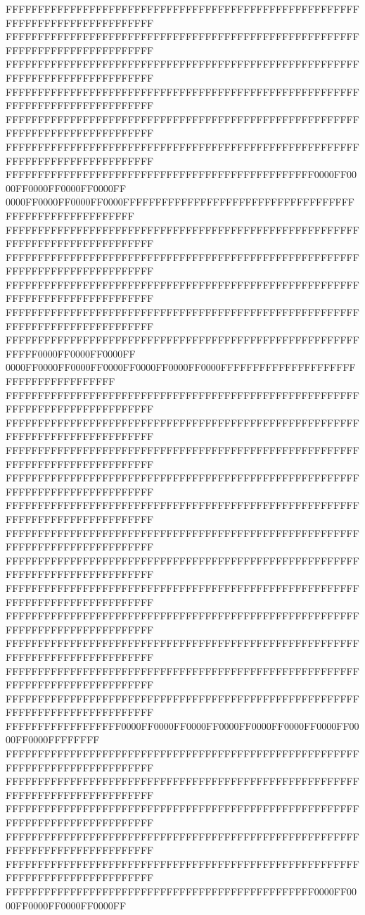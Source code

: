 FFFFFFFFFFFFFFFFFFFFFFFFFFFFFFFFFFFFFFFFFFFFFFFFFFFFFFFFFFFFFFFFFFFFFFFFFFFFFF
FFFFFFFFFFFFFFFFFFFFFFFFFFFFFFFFFFFFFFFFFFFFFFFFFFFFFFFFFFFFFFFFFFFFFFFFFFFFFF
FFFFFFFFFFFFFFFFFFFFFFFFFFFFFFFFFFFFFFFFFFFFFFFFFFFFFFFFFFFFFFFFFFFFFFFFFFFFFF
FFFFFFFFFFFFFFFFFFFFFFFFFFFFFFFFFFFFFFFFFFFFFFFFFFFFFFFFFFFFFFFFFFFFFFFFFFFFFF
FFFFFFFFFFFFFFFFFFFFFFFFFFFFFFFFFFFFFFFFFFFFFFFFFFFFFFFFFFFFFFFFFFFFFFFFFFFFFF
FFFFFFFFFFFFFFFFFFFFFFFFFFFFFFFFFFFFFFFFFFFFFFFFFFFFFFFFFFFFFFFFFFFFFFFFFFFFFF
FFFFFFFFFFFFFFFFFFFFFFFFFFFFFFFFFFFFFFFFFFFFFFFF0000FF0000FF0000FF0000FF0000FF
0000FF0000FF0000FF0000FFFFFFFFFFFFFFFFFFFFFFFFFFFFFFFFFFFFFFFFFFFFFFFFFFFFFFFF
FFFFFFFFFFFFFFFFFFFFFFFFFFFFFFFFFFFFFFFFFFFFFFFFFFFFFFFFFFFFFFFFFFFFFFFFFFFFFF
FFFFFFFFFFFFFFFFFFFFFFFFFFFFFFFFFFFFFFFFFFFFFFFFFFFFFFFFFFFFFFFFFFFFFFFFFFFFFF
FFFFFFFFFFFFFFFFFFFFFFFFFFFFFFFFFFFFFFFFFFFFFFFFFFFFFFFFFFFFFFFFFFFFFFFFFFFFFF
FFFFFFFFFFFFFFFFFFFFFFFFFFFFFFFFFFFFFFFFFFFFFFFFFFFFFFFFFFFFFFFFFFFFFFFFFFFFFF
FFFFFFFFFFFFFFFFFFFFFFFFFFFFFFFFFFFFFFFFFFFFFFFFFFFFFFFFFFFF0000FF0000FF0000FF
0000FF0000FF0000FF0000FF0000FF0000FF0000FFFFFFFFFFFFFFFFFFFFFFFFFFFFFFFFFFFFFF
FFFFFFFFFFFFFFFFFFFFFFFFFFFFFFFFFFFFFFFFFFFFFFFFFFFFFFFFFFFFFFFFFFFFFFFFFFFFFF
FFFFFFFFFFFFFFFFFFFFFFFFFFFFFFFFFFFFFFFFFFFFFFFFFFFFFFFFFFFFFFFFFFFFFFFFFFFFFF
FFFFFFFFFFFFFFFFFFFFFFFFFFFFFFFFFFFFFFFFFFFFFFFFFFFFFFFFFFFFFFFFFFFFFFFFFFFFFF
FFFFFFFFFFFFFFFFFFFFFFFFFFFFFFFFFFFFFFFFFFFFFFFFFFFFFFFFFFFFFFFFFFFFFFFFFFFFFF
FFFFFFFFFFFFFFFFFFFFFFFFFFFFFFFFFFFFFFFFFFFFFFFFFFFFFFFFFFFFFFFFFFFFFFFFFFFFFF
FFFFFFFFFFFFFFFFFFFFFFFFFFFFFFFFFFFFFFFFFFFFFFFFFFFFFFFFFFFFFFFFFFFFFFFFFFFFFF
FFFFFFFFFFFFFFFFFFFFFFFFFFFFFFFFFFFFFFFFFFFFFFFFFFFFFFFFFFFFFFFFFFFFFFFFFFFFFF
FFFFFFFFFFFFFFFFFFFFFFFFFFFFFFFFFFFFFFFFFFFFFFFFFFFFFFFFFFFFFFFFFFFFFFFFFFFFFF
FFFFFFFFFFFFFFFFFFFFFFFFFFFFFFFFFFFFFFFFFFFFFFFFFFFFFFFFFFFFFFFFFFFFFFFFFFFFFF
FFFFFFFFFFFFFFFFFFFFFFFFFFFFFFFFFFFFFFFFFFFFFFFFFFFFFFFFFFFFFFFFFFFFFFFFFFFFFF
FFFFFFFFFFFFFFFFFFFFFFFFFFFFFFFFFFFFFFFFFFFFFFFFFFFFFFFFFFFFFFFFFFFFFFFFFFFFFF
FFFFFFFFFFFFFFFFFFFFFFFFFFFFFFFFFFFFFFFFFFFFFFFFFFFFFFFFFFFFFFFFFFFFFFFFFFFFFF
FFFFFFFFFFFFFFFFFF0000FF0000FF0000FF0000FF0000FF0000FF0000FF0000FF0000FFFFFFFF
FFFFFFFFFFFFFFFFFFFFFFFFFFFFFFFFFFFFFFFFFFFFFFFFFFFFFFFFFFFFFFFFFFFFFFFFFFFFFF
FFFFFFFFFFFFFFFFFFFFFFFFFFFFFFFFFFFFFFFFFFFFFFFFFFFFFFFFFFFFFFFFFFFFFFFFFFFFFF
FFFFFFFFFFFFFFFFFFFFFFFFFFFFFFFFFFFFFFFFFFFFFFFFFFFFFFFFFFFFFFFFFFFFFFFFFFFFFF
FFFFFFFFFFFFFFFFFFFFFFFFFFFFFFFFFFFFFFFFFFFFFFFFFFFFFFFFFFFFFFFFFFFFFFFFFFFFFF
FFFFFFFFFFFFFFFFFFFFFFFFFFFFFFFFFFFFFFFFFFFFFFFFFFFFFFFFFFFFFFFFFFFFFFFFFFFFFF
FFFFFFFFFFFFFFFFFFFFFFFFFFFFFFFFFFFFFFFFFFFFFFFF0000FF0000FF0000FF0000FF0000FF

